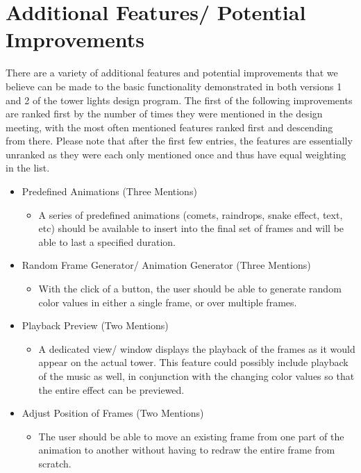 \documentclass[./spec.tex]{subfiles}
\begin{document}
\section{Additional Features/ Potential Improvements}
{There are a variety of additional features and potential improvements that we believe can be made to the basic functionality demonstrated in both versions 1 and 2 of the tower lights design program. The first of the following improvements are ranked first by the number of times they were mentioned in the design meeting, with the most often mentioned features ranked first and descending from there. Please note that after the first few entries, the features are essentially unranked as they were each only mentioned once and thus have equal weighting in the list.}

{\begin{itemize}
	\item Predefined Animations (Three Mentions)
	\begin{itemize}
		\item A series of predefined animations (comets, raindrops, snake effect, text, etc) should be available to insert into the final set of frames and will be able to last a specified duration.
	\end{itemize}
	\item Random Frame Generator/ Animation Generator (Three Mentions)
	\begin{itemize}
		\item With the click of a button, the user should be able to generate random color values in either a single frame, or over multiple frames.
	\end{itemize}
	\item Playback Preview (Two Mentions)
	\begin{itemize}
		\item A dedicated view/ window displays the playback of the frames as it would appear on the actual tower. This feature could possibly include playback of the music as well, in conjunction with the changing color values so that the entire effect can be previewed.
	\end{itemize}
	\item Adjust Position of Frames (Two Mentions)
	\begin{itemize}
		\item The user should be able to move an existing frame from one part of the animation to another without having to redraw the entire frame from scratch.
	\end{itemize}

\end{itemize}}
\end{document}
